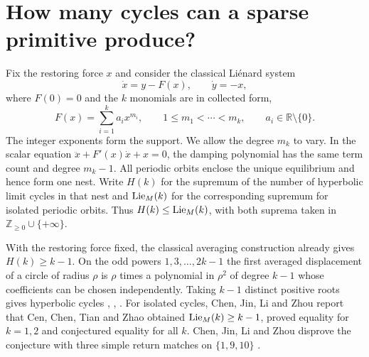 \section{How many cycles can a sparse primitive produce?}\label{sec:intro}
Fix the restoring force $x$ and consider the classical Li\'enard system
\begin{equation}\label{eq:lienard}
 \dot x=y-F(x),\qquad \dot y=-x ,
\end{equation}
where $F(0)=0$ and the $k$ monomials are in collected form,
\begin{equation}\label{eq:collected}
 F(x)=\sum_{i=1}^k a_i x^{m_i},\qquad
 1\le m_1<\cdots<m_k,\qquad a_i\in\mathbb R\setminus\{0\}.
\end{equation}
The integer exponents form the support. We allow the degree $m_k$ to
vary. In the scalar equation $\ddot x+F'(x)\dot x+x=0$, the damping
polynomial has the same term count and degree $m_k-1$. All periodic
orbits enclose the unique equilibrium and hence form one nest. Write
$H(k)$ for the supremum of the number of hyperbolic limit cycles in
that nest and $\operatorname{Lie}_{M}(k)$ for the corresponding supremum for isolated
periodic orbits. Thus $H(k)\le\operatorname{Lie}_{M}(k)$, with both suprema taken in
$\mathbb Z_{\ge0}\cup\{+\infty\}$.

With the restoring force fixed, the classical averaging construction
already gives $H(k)\ge k-1$. On the odd powers $1,3,\ldots,2k-1$ the
first averaged displacement of a circle of radius $\rho$ is $\rho$
times a polynomial in $\rho^2$ of degree $k-1$ whose coefficients
can be chosen independently. Taking $k-1$ distinct positive roots gives
hyperbolic cycles \cite[p.~336]{LMP}, \cite[\S II.B]{Sanjuan},
\cite[Theorem~1.1 and \S5]{BCG}. For isolated cycles, Chen, Jin, Li and Zhou
\cite[p.~2, Conjecture~A]{CJLZ} report that Cen, Chen, Tian and Zhao
\cite{CCTZ} obtained $\operatorname{Lie}_{M}(k)\ge k-1$, proved equality for $k=1,2$
and conjectured equality for all $k$. Chen, Jin, Li and Zhou disprove
the conjecture with three simple return matches on $\{1,9,10\}$
\cite[Theorem~1.2 and its proof]{CJLZ}.

